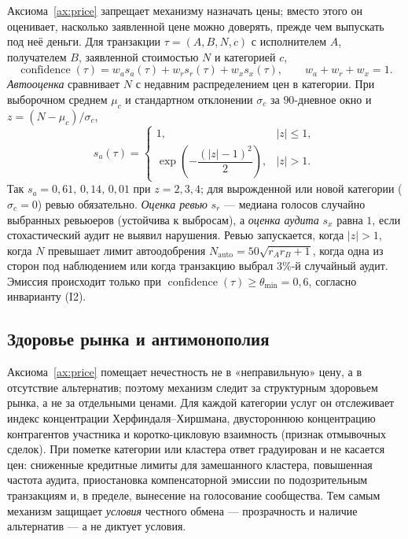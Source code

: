 \documentclass[11pt]{article}
\theoremstyle{plain}
\theoremstyle{definition}
\theoremstyle{remark}
\newcommand{\confidence}{\operatorname{confidence}}
\begin{document}
Аксиома~\ref{ax:price} запрещает механизму назначать цены; вместо этого он оценивает, насколько заявленной цене можно доверять, прежде чем выпускать под неё деньги. Для транзакции $\tau=(A,B,N,c)$ с исполнителем $A$, получателем $B$, заявленной стоимостью $N$ и категорией $c$,
\begin{equation}
\confidence(\tau) = w_a s_a(\tau) + w_r s_r(\tau) + w_x s_x(\tau), \qquad w_a+w_r+w_x=1 .
\end{equation}
\emph{Автооценка} сравнивает $N$ с недавним распределением цен в категории. При выборочном среднем $\mu_c$ и стандартном отклонении $\sigma_c$ за $90$-дневное окно и $z = (N-\mu_c)/\sigma_c$,
\begin{equation}\label{eq:autoscore}
s_a(\tau) = \begin{cases} 1, & |z| \le 1,\\[3pt] \exp\!\left(-\dfrac{(|z|-1)^2}{2}\right), & |z| > 1. \end{cases}
\end{equation}
Так $s_a = 0{,}61,\,0{,}14,\,0{,}01$ при $z = 2,3,4$; для вырожденной или новой категории ($\sigma_c=0$) ревью обязательно. \emph{Оценка ревью} $s_r$ --- медиана голосов случайно выбранных ревьюеров (устойчива к выбросам), а \emph{оценка аудита} $s_x$ равна $1$, если стохастический аудит не выявил нарушения. Ревью запускается, когда $|z|>1$, когда $N$ превышает лимит автоодобрения $N_{\mathrm{auto}} = 50\sqrt{r_A r_B + 1}$, когда одна из сторон под наблюдением или когда транзакцию выбрал $3\%$-й случайный аудит. Эмиссия происходит только при $\confidence(\tau) \ge \theta_{\min} = 0{,}6$, согласно инварианту (I2).

\subsection{Здоровье рынка и антимонополия}

Аксиома~\ref{ax:price} помещает нечестность не в «неправильную» цену, а в отсутствие альтернатив; поэтому механизм следит за структурным здоровьем рынка, а не за отдельными ценами. Для каждой категории услуг он отслеживает индекс концентрации Херфиндаля--Хиршмана, двустороннюю концентрацию контрагентов участника и коротко-цикловую взаимность (признак отмывочных сделок). При пометке категории или кластера ответ градуирован и не касается цен: сниженные кредитные лимиты для замешанного кластера, повышенная частота аудита, приостановка компенсаторной эмиссии по подозрительным транзакциям и, в пределе, вынесение на голосование сообщества. Тем самым механизм защищает \emph{условия} честного обмена --- прозрачность и наличие альтернатив --- а не диктует условия.
\end{document}

